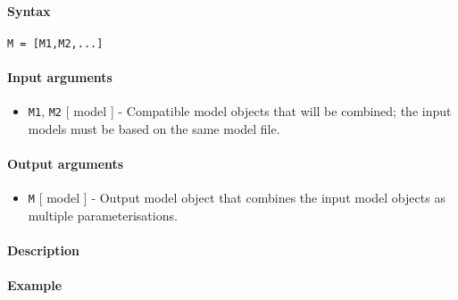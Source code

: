 


	\paragraph{Syntax}

\begin{verbatim}
M = [M1,M2,...]
\end{verbatim}

\paragraph{Input arguments}

\begin{itemize}
\itemsep1pt\parskip0pt
\item
  \texttt{M1}, \texttt{M2} {[} model {]} - Compatible model objects that
  will be combined; the input models must be based on the same model
  file.
\end{itemize}

\paragraph{Output arguments}

\begin{itemize}
\itemsep1pt\parskip0pt
\item
  \texttt{M} {[} model {]} - Output model object that combines the input
  model objects as multiple parameterisations.
\end{itemize}

\paragraph{Description}

\paragraph{Example}


